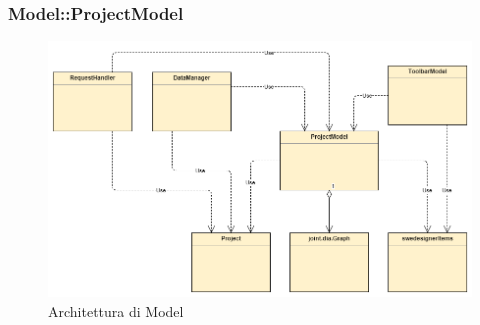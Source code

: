 \documentclass[../DefinizioneDiProdotto.tex]{subfiles}
\begin{document}
				\subsubsection{Model::ProjectModel}
				\hypertarget{SWEDesigner::Client::Model::ProjectModel}{}
					\begin{figure}[H]\label{fig:Model}
						\centering
						\includegraphics[scale=0.46]{Immagini/DiagrammaArchitettura/MainModel.png}
						\caption{Architettura di Model}
					\end{figure}
\end{document}
